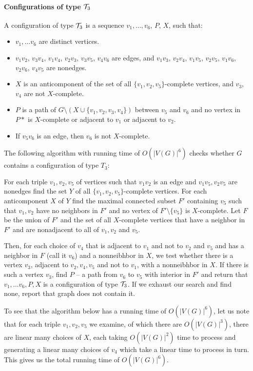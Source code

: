 \documentclass{article}
\begin{document}
\paragraph{Configurations of type $\mathcal{T}_3$}

A configuration of type $\mathcal{T}_3$ is a sequence $v_1, \ldots, v_6$, $P$, $X$, such that:
\begin{itemize}
	\item $v_1, \ldots v_6$ are distinct vertices.
	\item $v_1v_2$, $v_3v_4$, $v_1v_4$, $v_2v_3$, $v_3v_5$, $v_4v_6$ are edges, and $v_1v_3$, $v_2v_4$, $v_1v_5$, $v_2v_5$, $v_1v_6$, $v_2v_6$, $v_4v_5$ are nonedges.
	\item $X$ is an anticomponent of the set of all $\{v_1, v_2, v_5\}$-complete vertices, and $v_3$, $v_4$ are not $X$-complete.
	\item $P$ is a path of $G \setminus ( X \cup \{v_1, v_2, v_3, v_4\} )$ between $v_5$ and $v_6$ and no vertex in $P*$ is $X$-complete or adjacent to $v_1$ or adjacent to $v_2$.
	\item If $v_5v_6$ is an edge, then $v_6$ is not $X$-complete.
\end{itemize}


The following algorithm with running time of $O(|V(G)|^6)$ checks whether $G$ contains a configuration of type $T_3$:

For each triple $v_1, v_2, v_5$ of vertices such that $v_1v_2$ is an edge and $v_1v_5, v_2v_5$ are nonedges find the set $Y$ of all $\{v_1, v_2, v_5\}$-complete vertices. For each anticomponent $X$ of $Y$ find the maximal connected subset $F'$ containing $v_5$ such that $v_1, v_2$ have no neighbors in $F'$ and no vertex of $F'\setminus\{v_5\}$ is $X$-complete. Let $F$ be the union of $F'$ and the set of all $X$-complete vertices that have a neighbor in $F'$ and are nonadjacent to all of $v_1, v_2$ and $v_5$.

Then, for each choice of $v_4$ that is adjacent to $v_1$ and not to $v_2$ and $v_5$ and has a neighbor in $F$ (call it $v_6$) and a nonneibhbor in $X$, we test whether there is a vertex $v_3$, adjacent to $v_2, v_4, v_5$ and not to $v_1$, with a nonneibhbor in $X$. If there is such a vertex $v_3$, find $P$ -- a path from $v_6$ to $v_5$ with interior in $F'$ and return that $v_1, \ldots v_6, P, X$ is a configuration of type $\mathcal{T}_3$. If we exhaust our search and find none, report that graph does not contain it.

To see that the algorithm below has a running time of $O(|V(G)|^6)$, let us note that for each triple $v_1, v_2, v_5$ we examine, of which there are $O(|V(G)|^3)$, there are linear many choices of $X$, each taking $O(|V(G)|^2)$ time to process and generating a linear many choices of $v_4$ which take a linear time to process in turn. This gives us the total running time of $O(|V(G)|^6)$.
\end{document}
